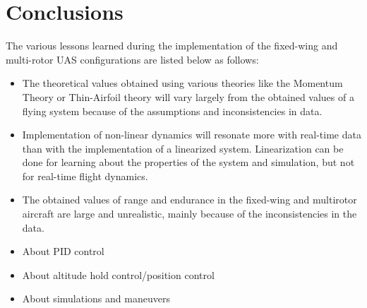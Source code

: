 \chapter{Conclusions}
The various lessons learned during the implementation of the fixed-wing and multi-rotor UAS configurations are listed below as follows: \\
\begin{itemize}
	\item The theoretical values obtained using various theories like the Momentum Theory or Thin-Airfoil theory will vary largely from the obtained values of a flying system because of the assumptions and inconsistencies in data. 
	\item Implementation of non-linear dynamics will resonate more with real-time data than with the implementation of a linearized system. Linearization can be done for learning about the properties of the system and simulation, but not for real-time flight dynamics.
    \item The obtained values of range and endurance in the fixed-wing and multirotor aircraft are large and unrealistic, mainly because of the inconsistencies in the data.
    \item About PID control
    \item About altitude hold control/position control
    \item About simulations and maneuvers
\end{itemize}